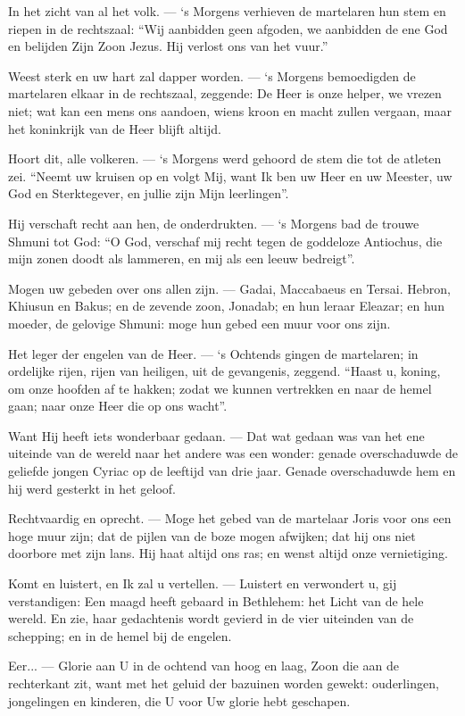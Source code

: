 \documentclass[12pt,twoside,a5paper]{article}
\begin{document}
\begin{halfparskip}
  In het zicht van al het volk. --- `s Morgens verhieven de martelaren hun stem en riepen in de rechtszaal: ``Wij aanbidden geen afgoden, we aanbidden de ene God en belijden Zijn Zoon Jezus. Hij verlost ons van het vuur.''

  Weest sterk en uw hart zal dapper worden. --- `s Morgens bemoedigden de martelaren elkaar in de rechtszaal, zeggende: De Heer is onze helper, we vrezen niet; wat kan een mens ons aandoen, wiens kroon en macht zullen vergaan, maar het koninkrijk van de Heer blijft altijd.

  Hoort dit, alle volkeren. --- `s Morgens werd gehoord de stem die tot de atleten zei. ``Neemt uw kruisen op en volgt Mij, want Ik ben uw Heer en uw Meester, uw God en Sterktegever, en jullie zijn Mijn leerlingen''.

  Hij verschaft recht aan hen, de onderdrukten. --- `s Morgens bad de trouwe Shmuni tot God: ``O God, verschaf mij recht tegen de goddeloze Antiochus, die mijn zonen doodt als lammeren, en mij als een leeuw bedreigt''.

  Mogen uw gebeden over ons allen zijn. --- Gadai, Maccabaeus en Tersai. Hebron, Khiusun en Bakus; en de zevende zoon, Jonadab; en hun leraar Eleazar; en hun moeder, de gelovige Shmuni: moge hun gebed een muur voor ons zijn.

  Het leger der engelen van de Heer. --- `s Ochtends gingen de martelaren; in ordelijke rijen, rijen van heiligen, uit de gevangenis, zeggend. ``Haast u, koning, om onze hoofden af te hakken; zodat we kunnen vertrekken en naar de hemel gaan; naar onze Heer die op ons wacht''.

  Want Hij heeft iets wonderbaar gedaan. --- Dat wat gedaan was van het ene uiteinde van de wereld naar het andere was een wonder: genade overschaduwde de geliefde jongen Cyriac op de leeftijd van drie jaar. Genade overschaduwde hem en hij werd gesterkt in het geloof.

  Rechtvaardig en oprecht. --- Moge het gebed van de martelaar Joris voor ons een hoge muur zijn; dat de pijlen van de boze mogen afwijken; dat hij ons niet doorbore met zijn lans. Hij haat altijd ons ras; en wenst altijd onze vernietiging.

  Komt en luistert, en Ik zal u vertellen. --- Luistert en verwondert u, gij verstandigen: Een maagd heeft gebaard in Bethlehem: het Licht van de hele wereld. En zie, haar gedachtenis wordt gevierd in de vier uiteinden van de schepping; en in de hemel bij de engelen.

  Eer... --- Glorie aan U in de ochtend van hoog en laag, Zoon die aan de rechterkant zit, want met het geluid der bazuinen worden gewekt: ouderlingen, jongelingen en kinderen, die U voor Uw glorie hebt geschapen.


\end{halfparskip}
\end{document}
